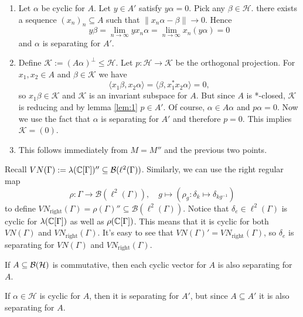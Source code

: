 \begin{myproof}
  \begin{enumerate}
    \item Let $\alpha$ be cyclic for $A$. Let $y \in A'$ satisfy $y \alpha = 0$.
    Pick any $\beta \in \mathcal{H}$. there exists a sequence $(x_n)_n \subseteq A$ such that $\|x_n \alpha - \beta\| \to 0$.
    Hence $$y \beta = \lim_{n \to \infty} yx_n \alpha = \lim_{n \to \infty} x_n (y\alpha) = 0$$
    and $\alpha$ is separating for $A'$.
    \item Define $\mathcal{K} := (A \alpha)^{\perp} \leq \mathcal{H}$.
    Let $p: \mathcal{H} \to \mathcal{K}$ be the orthogonal projection.
    For $x_1, x_2 \in A$ and $\beta \in \mathcal{K}$ we have 
    $$\langle x_1 \beta, x_2 \alpha\rangle = \langle \beta, x_1 ^* x_2 \alpha \rangle = 0,$$
    so $x_1 \beta \in \mathcal{K}$ and $\mathcal{K}$ is an invariant subspace for $A$.
    But since $A$ is *-closed, $\mathcal{K}$ is reducing and by lemma \ref{lem:1} $p \in A'$.
    Of course, $\alpha \in A \alpha$ and $p\alpha = 0$. Now we use the fact that $\alpha$ is 
    separating for $A'$ and therefore $p = 0$. This implies $\mathcal{K} = (0)$.
    \item This follows immediately from $M = M''$ and the previous two points.
  \end{enumerate}
\end{myproof}

\begin{example}
  Recall $VN (\Gamma) := \lambda (\mathbb {C} [\Gamma])'' \subseteq \mathcal{B} (\ell^2 (\Gamma))$.
  Similarly, we can use the right regular map 
  $$\rho: \Gamma \to \mathcal{B} (\ell^2 (\Gamma)),\quad g \mapsto (\rho_g: \delta_k \mapsto \delta_{kg^{-1}})$$
  to define $VN_{\mathrm{right}} (\Gamma) = \rho(\Gamma)'' \subseteq \mathcal{B} (\ell^2 (\Gamma))$.
  Notice that $\delta_e \in \ell^2 (\Gamma)$ is cyclic for $\lambda (\mathbb {C} [\Gamma])$ as well as $\rho(\mathbb {C}[\Gamma])$.
  This means that it is cyclic for both $VN(\Gamma)$ and $VN_{\mathrm{right}} (\Gamma)$.
  It's easy to see that $VN(\Gamma)' = VN_{\mathrm{right}} (\Gamma)$, so $\delta_e$
  is separating for $VN(\Gamma)$ and $VN_{\mathrm{right}} (\Gamma)$.
\end{example}

\begin{corollary}
  If $A \subseteq \operatorname{\mathcal{B} (\mathcal{H})}$ is commutative, then each cyclic vector for $A$ is also separating for $A$.
\end{corollary}

\begin{myproof}
  If $\alpha \in \mathcal{H}$ is cyclic for $A$, then it is separating for $A'$, 
  but since $A \subseteq A'$ it is also separating for $A$.
\end{myproof}

